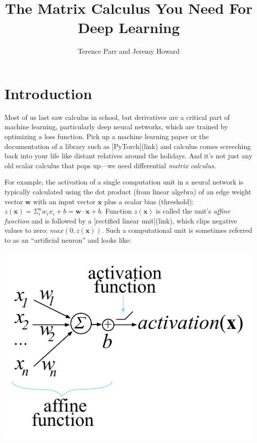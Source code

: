 \documentclass[11pt]{article}
\title{The Matrix Calculus You Need For Deep Learning}
\author{Terence Parr and Jeremy Howard}
\begin{document}
\maketitle

\section{Introduction}

Most of us last saw calculus in school, but derivatives are a critical part of machine learning, particularly deep neural networks, which are trained by optimizing a loss function. Pick up a machine learning paper or the documentation of a library such as [PyTorch](link) and calculus comes screeching back into your life like distant relatives around the holidays.  And it's not just any old scalar calculus that pops up---we need differential {\em matrix calculus}. 

For example, the activation of a single computation unit in a neural network is typically calculated using the dot product (from linear algebra) of an edge weight vector $\mathbf{w}$ with an input vector $\mathbf{x}$ plus a scalar bias (threshold): $z(\mathbf{x}) = \Sigma_i^n w_i x_i + b = \mathbf{w} \cdot \mathbf{x} + b$. Function $z(\mathbf{x})$ is called the unit's {\em affine function} and is followed by a [rectified linear unit](link), which clips negative values to zero: $max(0, z(\mathbf{x}))$. Such a computational unit is sometimes referred to as an ``artificial neuron'' and looks like:

\begin{center}
	\includegraphics[scale=.9]{neuron.png}
\end{center}
\end{document}
